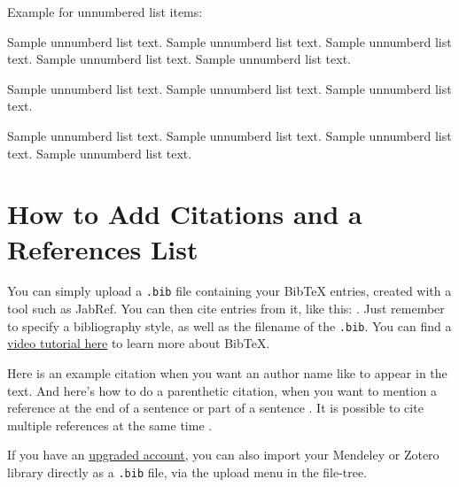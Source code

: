 \documentclass[12pt,a4paper]{article}
\newenvironment{unlist}{%
  \begin{list}{}{%
    \setlength{\labelwidth}{0pt}%
    \setlength{\labelsep}{0pt}%
    \setlength{\leftmargin}{2em}%
    \setlength{\itemindent}{-2em}%
    \setlength{\topsep}{\medskipamount}%
    \setlength{\itemsep}{3pt}%
  }%
}{%
  \end{list}%
}
\begin{document}
\noindent
Example for unnumbered list items:

\begin{unlist}
\item Sample unnumberd list text. Sample unnumberd list text. Sample unnumberd list text. Sample unnumberd list text. Sample unnumberd list text.

\item Sample unnumberd list text. Sample unnumberd list text. Sample unnumberd list text.

\item Sample unnumberd list text. Sample unnumberd list text. Sample unnumberd list text. Sample unnumberd list text. 
\end{unlist}


\section{How to Add Citations and a References List}

You can simply upload a \verb|.bib| file containing your BibTeX entries, created with a tool such as JabRef. You can then cite entries from it, like this: \textcite{greenwade93}. Just remember to specify a bibliography style, as well as the filename of the \verb|.bib|. You can find a \href{https://www.overleaf.com/help/97-how-to-include-a-bibliography-using-bibtex}{video tutorial here} to learn more about BibTeX.

Here is an example citation when you want an author name like \textcite{collins2011a} to appear in the text. And here's how to do a parenthetic citation, when you want to mention a reference at the end of a sentence or part of a sentence \parencite{collins2013}. It is possible to cite multiple references at the same time \parencite{collins2011b,collins2016,lunn2007a,lunn2007b,ross2006,shannon1948}.

If you have an \href{https://www.overleaf.com/user/subscription/plans}{upgraded account}, you can also import your Mendeley or Zotero library directly as a \verb|.bib| file, via the upload menu in the file-tree.
\end{document}
